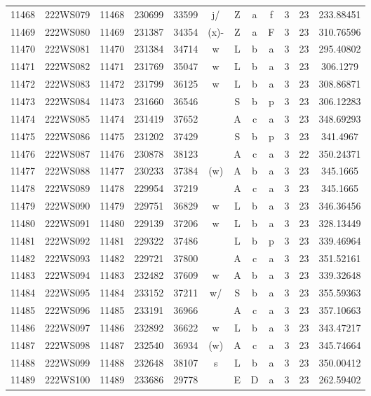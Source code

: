 \begin{tabular}{|*{12}{c|}}
11468 & 222WS079 & 11468 & 230699 & 33599 & j/ & Z & a & f & 3 & 23 & 233.88451 \\ 
11469 & 222WS080 & 11469 & 231387 & 34354 & (x)- & Z & a & F & 3 & 23 & 310.76596 \\ 
11470 & 222WS081 & 11470 & 231384 & 34714 & w & L & b & a & 3 & 23 & 295.40802 \\ 
11471 & 222WS082 & 11471 & 231769 & 35047 & w & L & b & a & 3 & 23 & 306.1279 \\ 
11472 & 222WS083 & 11472 & 231799 & 36125 & w & L & b & a & 3 & 23 & 308.86871 \\ 
11473 & 222WS084 & 11473 & 231660 & 36546 &  & S & b & p & 3 & 23 & 306.12283 \\ 
11474 & 222WS085 & 11474 & 231419 & 37652 &  & A & c & a & 3 & 23 & 348.69293 \\ 
11475 & 222WS086 & 11475 & 231202 & 37429 &  & S & b & p & 3 & 23 & 341.4967 \\ 
11476 & 222WS087 & 11476 & 230878 & 38123 &  & A & c & a & 3 & 22 & 350.24371 \\ 
11477 & 222WS088 & 11477 & 230233 & 37384 & (w) & A & b & a & 3 & 23 & 345.1665 \\ 
11478 & 222WS089 & 11478 & 229954 & 37219 &  & A & c & a & 3 & 23 & 345.1665 \\ 
11479 & 222WS090 & 11479 & 229751 & 36829 & w & L & b & a & 3 & 23 & 346.36456 \\ 
11480 & 222WS091 & 11480 & 229139 & 37206 & w & L & b & a & 3 & 23 & 328.13449 \\ 
11481 & 222WS092 & 11481 & 229322 & 37486 &  & L & b & p & 3 & 23 & 339.46964 \\ 
11482 & 222WS093 & 11482 & 229721 & 37800 &  & A & c & a & 3 & 23 & 351.52161 \\ 
11483 & 222WS094 & 11483 & 232482 & 37609 & w & A & b & a & 3 & 23 & 339.32648 \\ 
11484 & 222WS095 & 11484 & 233152 & 37211 & w/ & S & b & a & 3 & 23 & 355.59363 \\ 
11485 & 222WS096 & 11485 & 233191 & 36966 &  & A & c & a & 3 & 23 & 357.10663 \\ 
11486 & 222WS097 & 11486 & 232892 & 36622 & w & L & b & a & 3 & 23 & 343.47217 \\ 
11487 & 222WS098 & 11487 & 232540 & 36934 & (w) & A & c & a & 3 & 23 & 345.74664 \\ 
11488 & 222WS099 & 11488 & 232648 & 38107 & s & L & b & a & 3 & 23 & 350.00412 \\ 
11489 & 222WS100 & 11489 & 233686 & 29778 &  & E & D & a & 3 & 23 & 262.59402 \\ 

\end{tabular}
